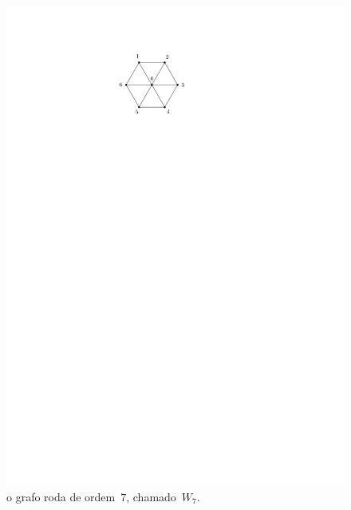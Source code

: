 \documentclass[12pt, a4paper]{article}
\theoremstyle{definition}
\begin{document}
\begin{figure}[H]
    \centering
    \includegraphics{roda.pdf}
    \caption{o grafo roda de ordem~$7$, chamado~$W_7$.}
    \label{fig:roda}
\end{figure}
\end{document}
